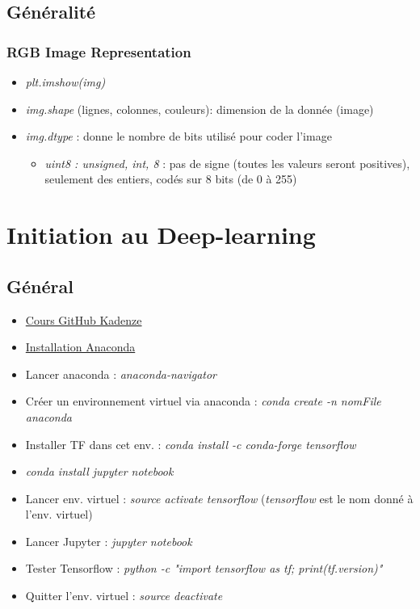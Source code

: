 \documentclass[12pt,a4paper]{article}
\begin{document}
\subsection{Généralité}
\subsubsection{RGB Image Representation}
\begin{itemize}
\item \textit{plt.imshow(img)}
\item \textit{img.shape} (lignes, colonnes, couleurs): dimension de la donnée (image)
\item \textit{img.dtype} : donne le nombre de bits utilisé pour coder l'image
\begin{itemize}
\item \textit{uint8 : unsigned, int, 8} : pas de signe (toutes les valeurs seront positives), seulement des entiers, codés sur 8 bits (de 0 à 255)
\end{itemize}
\end{itemize}

\section{Initiation au Deep-learning}
\subsection{Général}
\begin{itemize}
\item \href{https://github.com/pkmital/CADL}{Cours GitHub Kadenze}
\item \href{http://docs.continuum.io/anaconda/install/linux/}{Installation Anaconda}
\item Lancer anaconda : \textit{anaconda-navigator}
\item Créer un environnement virtuel via anaconda : \textit{conda create -n nomFile anaconda}
\item Installer TF dans cet env. : \textit{conda install -c conda-forge tensorflow}
\item \textit{conda install jupyter notebook}
\item Lancer env. virtuel : \textit{source activate tensorflow} (\textit{tensorflow} est le nom donné à l'env. virtuel)
\item Lancer Jupyter : \textit{jupyter notebook}
\item Tester Tensorflow : \textit{python -c "import tensorflow as tf; print(tf.\textunderscore \textunderscore version\textunderscore \textunderscore)"}
\item Quitter l'env. virtuel : \textit{source deactivate}
\end{itemize}
\end{document}
